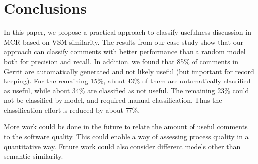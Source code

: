 
\section{Conclusions}

In this paper, we propose a practical approach to classify usefulness discussion in MCR based on VSM similarity.
The results from our case study show that our approach can classify comments with better performance than a random model both for precision and recall.
In addition, we found that 85\% of comments in Gerrit are automatically generated and not likely useful (but important for record keeping).
For the remaining 15\%, about 43\% of them are automatically classified as useful, while about 34\% are classified as not useful.
The remaining 23\% could not be classified by model, and required manual classification.
Thus the classification effort is reduced by about 77\%.

More work could be done in the future to relate the amount of useful comments to the software quality.
This could enable a way of assessing process quality in a quantitative way.
Future work could also consider different models other than semantic similarity.